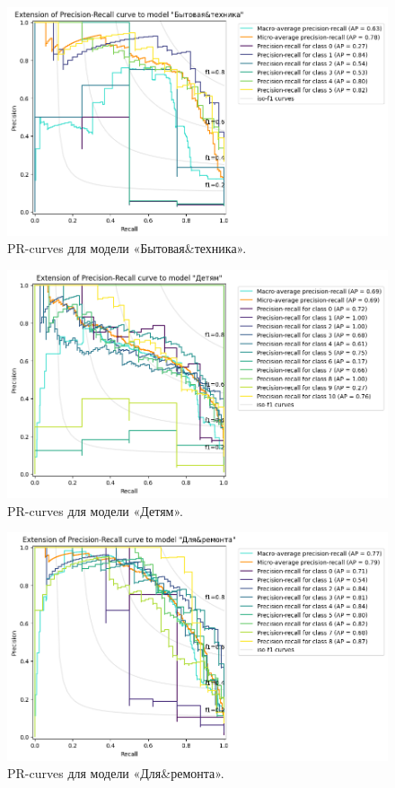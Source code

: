\documentclass[a4paper,12pt]{extarticle}
\begin{document}
\begin{figure}[hbtp]
	\centering
	\includegraphics[scale=0.7]{pr_curves/prcurve_Бытовая&техника.png}
	\caption{PR-curves для модели «Бытовая\&техника».}
	\label{fig:prcurve_Бытовая&техника}
\end{figure}

\begin{figure}[hbtp]
	\centering
	\includegraphics[scale=0.7]{pr_curves/prcurve_Детям.png}
	\caption{PR-curves для модели «Детям».}
	\label{fig:prcurve_Детям}
\end{figure}

\begin{figure}[hbtp]
	\centering
	\includegraphics[scale=0.7]{pr_curves/prcurve_Для&ремонта.png}
	\caption{PR-curves для модели «Для\&ремонта».}
	\label{fig:prcurve_Для&ремонта}
\end{figure}
\end{document}
